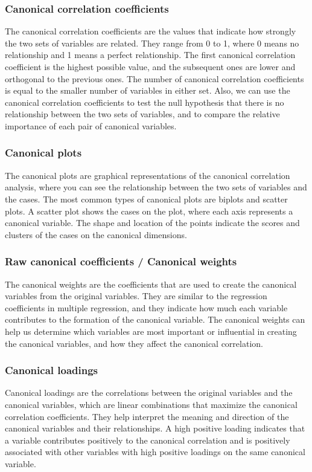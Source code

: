 \documentclass[11pt]{article}
\begin{document}
			\subsubsection{Canonical correlation coefficients}
			The canonical correlation coefficients are the values that indicate how strongly the two sets of variables are related. They range from 0 to 1, where 0 means no relationship and 1 means a perfect relationship. The first canonical correlation coefficient is the highest possible value, and the subsequent ones are lower and orthogonal to the previous ones. The number of canonical correlation coefficients is equal to the smaller number of variables in either set. Also, we can use the canonical correlation coefficients to test the null hypothesis that there is no relationship between the two sets of variables, and to compare the relative importance of each pair of canonical variables.
		
			
			\subsubsection{Canonical plots}
			The canonical plots are graphical representations of the canonical correlation analysis, where you can see the relationship between the two sets of variables and the cases. The most common types of canonical plots are biplots and scatter plots. A scatter plot shows the cases on the plot, where each axis represents a canonical variable. The shape and location of the points indicate the scores and clusters of the cases on the canonical dimensions.
			
			\subsubsection{Raw canonical coefficients / Canonical weights}
			The canonical weights are the coefficients that are used to create the canonical variables from the original variables. They are similar to the regression coefficients in multiple regression, and they indicate how much each variable contributes to the formation of the canonical variable. The canonical weights can help us determine which variables are most important or influential in creating the canonical variables, and how they affect the canonical correlation.
			
			
			\subsubsection{Canonical loadings}
			Canonical loadings are the correlations between the original variables and the canonical variables, which are linear combinations that maximize the canonical correlation coefficients. They help interpret the meaning and direction of the canonical variables and their relationships. A high positive loading indicates that a variable contributes positively to the canonical correlation and is positively associated with other variables with high positive loadings on the same canonical variable.
			
\end{document}
